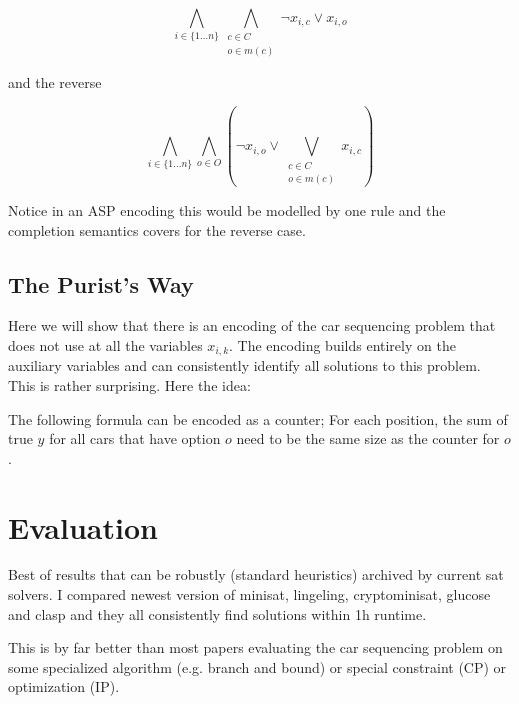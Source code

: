 \documentclass[]{llncs}
\begin{document}
\begin{equation}
    \bigwedge_{i\in \{1\ldots n\}} \bigwedge_{\substack{c \in C \\ o \in m(c)}} \neg x_{i,c} \vee x_{i,o}
\end{equation}

and the reverse

\begin{equation}
    \bigwedge_{i \in \{1\dots n\}} \bigwedge_{o\in O} (\neg x_{i,o} \vee \bigvee_{\substack{c \in C \\ o \in m(c)}} x_{i,c})
\end{equation}

Notice in an ASP encoding this would be modelled by one rule and the
completion semantics covers for the reverse case. 

\subsection{The Purist's Way}

Here we will show that there is an encoding of the car sequencing
problem that does not use at all the variables $x_{i,k}$. The encoding
builds entirely on the auxiliary variables and can consistently identify
all solutions to this problem. This is rather surprising. Here the idea: 

The following formula can be encoded as a counter; For each position, the
sum of true $y$ for all cars that have option $o$ need to be the same
size as the counter for $o$.


\section{Evaluation}

Best of results that can be robustly (standard heuristics) archived by
current sat solvers. I compared newest version of minisat, lingeling,
cryptominisat, glucose and clasp and they all consistently find
solutions within 1h runtime. 

\DTLsetseparator{,}

\begin{table}[htbp]
    \caption{}
    \centering
\end{table}


This is by far better than most papers evaluating the car sequencing
problem on some specialized algorithm (e.g. branch and bound) or special
constraint (CP) or optimization (IP). 
\end{document}
